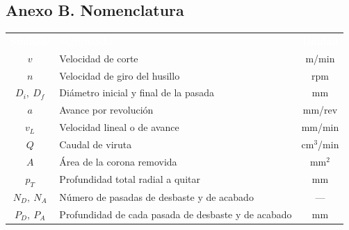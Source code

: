 \documentclass[12pt,a4paper]{article}
\newcommand{\encab}[1]{\textcolor{white}{\sffamily\bfseries #1}}
\begin{document}
\subsection*{Anexo B. Nomenclatura}

\begin{table}[!htb]
	\centering
	\small
	\begin{tabularx}{\linewidth}{c X c}
		\rowcolor{darkblue}
		\encab{Símbolo}       & \encab{Significado}                                              & \encab{Unidad} \\
		$v$                   & Velocidad de corte
		                      &
		m/min                                                                                                     \\
		$n$                   & Velocidad de giro del husillo
		                      & rpm                                                                               \\
		$D_i,\ D_f$           & Diámetro inicial y final de la pasada                            &
		mm                                                                                                        \\
		$a$                   & Avance por revolución                                            &
		mm/rev                                                                                                    \\
		$v_L$                 & Velocidad lineal o de avance                                     &
		mm/min                                                                                                    \\
		$Q$                   & Caudal de viruta                                                 & cm$^3$/min     \\
		$A$                   & Área de la corona removida                                       &
		mm$^2$                                                                                                    \\
		$p_T$                 & Profundidad total radial a quitar                                & mm             \\
		$N_D,\ N_A$           & Número de pasadas de desbaste y de acabado                       & ---            \\
		$P_D,\ P_A$           & Profundidad de cada pasada de desbaste y de acabado              & mm             \\

\end{tabularx}
\end{table}
\end{document}
